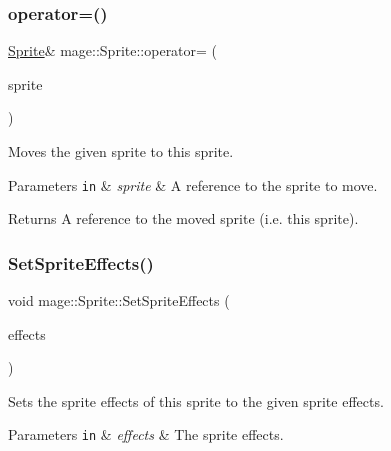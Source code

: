 \subsubsection{\texorpdfstring{operator=()}{operator=()}\hspace{0.1cm}{\footnotesize\ttfamily [2/2]}}
{\footnotesize\ttfamily \hyperlink{classmage_1_1_sprite}{Sprite}\& mage\+::\+Sprite\+::operator= (\begin{DoxyParamCaption}\item[{\hyperlink{classmage_1_1_sprite}{Sprite} \&\&}]{sprite }\end{DoxyParamCaption})\hspace{0.3cm}{\ttfamily [delete]}}

Moves the given sprite to this sprite.


\begin{DoxyParams}[1]{Parameters}
\mbox{\tt in}  & {\em sprite} & A reference to the sprite to move. \\
\hline
\end{DoxyParams}
\begin{DoxyReturn}{Returns}
A reference to the moved sprite (i.\+e. this sprite). 
\end{DoxyReturn}
\hypertarget{classmage_1_1_sprite_abeefc8ed41e55924be83ba7b480aa40e}{}\label{classmage_1_1_sprite_abeefc8ed41e55924be83ba7b480aa40e} 
\subsubsection{\texorpdfstring{Set\+Sprite\+Effects()}{SetSpriteEffects()}}
{\footnotesize\ttfamily void mage\+::\+Sprite\+::\+Set\+Sprite\+Effects (\begin{DoxyParamCaption}\item[{\hyperlink{namespacemage_a9cfe18123066ba4236f548f9de75d881}{Sprite\+Effect}}]{effects }\end{DoxyParamCaption})\hspace{0.3cm}{\ttfamily [noexcept]}}

Sets the sprite effects of this sprite to the given sprite effects.


\begin{DoxyParams}[1]{Parameters}
\mbox{\tt in}  & {\em effects} & The sprite effects. \\
\hline
\end{DoxyParams}


